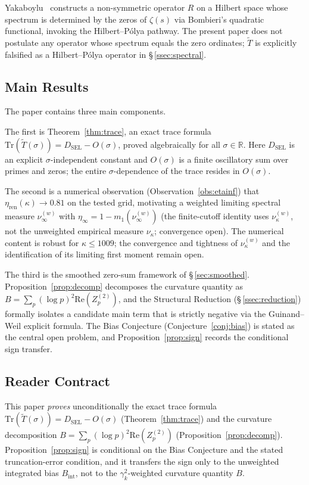 \documentclass[11pt]{article}
\newcommand{\etaren}{\eta_{\mathrm{ren}}}
\newcommand{\Tt}{\widetilde{T}}
\newcommand{\DSEL}{D_{\mathrm{SEL}}}
\begin{document}
Yakaboylu~\cite{Yakaboylu26} constructs a non-symmetric operator $R$
on a Hilbert space whose spectrum is determined by the zeros of
$\zeta(s)$ via Bombieri's quadratic functional, invoking the
Hilbert--P\'olya pathway.
The present paper does not postulate any operator whose spectrum
equals the zero ordinates; $\Tt$ is explicitly falsified as a
Hilbert--P\'olya operator in \S\,\ref{ssec:spectral}.

\subsection{Main Results}

The paper contains three main components.

The first is Theorem~\ref{thm:trace}, an exact trace formula
$\mathrm{Tr}(\Tt(\sigma)) = \DSEL - O(\sigma)$,
proved algebraically for all $\sigma\in\mathbb{R}$.
Here $\DSEL$ is an explicit $\sigma$-independent constant and
$O(\sigma)$ is a finite oscillatory sum over primes and zeros;
the entire $\sigma$-dependence of the trace resides in $O(\sigma)$.

The second is a numerical observation (Observation~\ref{obs:etainf})
that $\etaren(\kappa)\to 0.81$ on the tested grid,
motivating a weighted limiting spectral measure $\nu_\infty^{(w)}$
with $\eta_\infty = 1-m_1(\nu_\infty^{(w)})$
(the finite-cutoff identity uses $\nu_\kappa^{(w)}$, not the
unweighted empirical measure $\nu_\kappa$; convergence open).
The numerical content is robust for $\kappa\leq 1009$;
the convergence and tightness of $\nu_\kappa^{(w)}$
and the identification of its limiting first moment remain open.

The third is the smoothed zero-sum framework of \S\,\ref{sec:smoothed}.
Proposition~\ref{prop:decomp} decomposes the curvature quantity as
$B = \sum_p(\log p)^2\allowbreak\mathrm{Re}(Z_p^{(2)})$,
and the Structural Reduction (\S\,\ref{ssec:reduction})
formally isolates a candidate main term that is strictly negative
via the Guinand--Weil explicit formula.
The Bias Conjecture (Conjecture~\ref{conj:bias}) is stated as the
central open problem, and Proposition~\ref{prop:sign} records the
conditional sign transfer.

\subsection{Reader Contract}

This paper \emph{proves} unconditionally the exact trace formula
$\mathrm{Tr}(\Tt(\sigma)) = \DSEL - O(\sigma)$ (Theorem~\ref{thm:trace})
and the curvature decomposition
$B = \sum_p(\log p)^2\mathrm{Re}(Z_p^{(2)})$
(Proposition~\ref{prop:decomp}).
Proposition~\ref{prop:sign} is conditional on the Bias
Conjecture and the stated truncation-error condition, and it
transfers the sign only to the unweighted integrated bias
$B_{\mathrm{int}}$, not to the $\gamma_k^2$-weighted curvature
quantity $B$.
\end{document}
